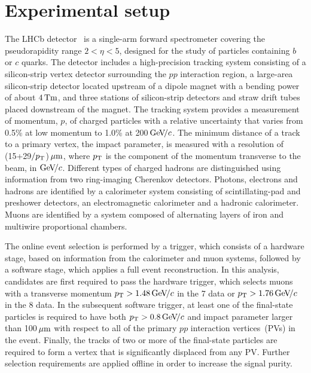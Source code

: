 \documentclass[12pt,a4paper]{article}
\def\ptot       {\mbox{$p$}\xspace}
\def\pt         {\mbox{$p_{\rm T}$}\xspace}
\def\Pb      {\ensuremath{b}\xspace}
\def\Pc      {\ensuremath{c}\xspace}
\def\cquark    {\ensuremath{\Pc}\xspace}
\def\bquark    {\ensuremath{\Pb}\xspace}
\def\lhcb {\mbox{LHCb}\xspace}
\def\mum  {\ensuremath{\rm \mu m}\xspace}
\newcommand{\tev}{\ifthenelse{\boolean{inbibliography}}{\ensuremath{~T\kern -0.05em eV}\xspace}{\ensuremath{\mathrm{\,Te\kern -0.1em V}}}\xspace}
\newcommand{\gevc}{\ensuremath{{\mathrm{\,Ge\kern -0.1em V\!/}c}}\xspace}
\begin{document}
\section{Experimental setup}
\label{sec:exp_setup}

The \lhcb detector~\cite{LHCb-DP-2014-002,Alves:2008zz} is a single-arm forward
spectrometer covering the \mbox{pseudorapidity} range $2<\eta <5$,
designed for the study of particles containing \bquark or \cquark
quarks. The detector includes a high-precision tracking system
consisting of a silicon-strip vertex detector surrounding the $pp$
interaction region, a large-area silicon-strip detector located
upstream of a dipole magnet with a bending power of about
$4{\rm\,Tm}$, and three stations of silicon-strip detectors and straw
drift tubes placed downstream of the magnet.
The tracking system provides a measurement of momentum, \ptot, of charged particles with
a relative uncertainty that varies from 0.5\% at low momentum to 1.0\% at 200\gevc.
The minimum distance of a track to a primary vertex, the impact parameter, is measured with a resolution of (15+29$/\pt$)$\,\mum$,
where \pt is the component of the momentum transverse to the beam, in\,\gevc.
Different types of charged hadrons are distinguished using information
from two ring-imaging Cherenkov detectors. 
Photons, electrons and hadrons are identified by a calorimeter system consisting of
scintillating-pad and preshower detectors, an electromagnetic
calorimeter and a hadronic calorimeter. Muons are identified by a
system composed of alternating layers of iron and multiwire
proportional chambers.

The online event selection is performed by a trigger, 
which consists of a hardware stage, based on information from the calorimeter and muon
systems, followed by a software stage, which applies a full event
reconstruction.
In this analysis, candidates are first required to pass the hardware trigger,
  which selects muons with a transverse momentum $\pt>1.48\gevc$ 
  in the 7\tev data or $\pt>1.76\gevc$ in the 8\tev data.
  In the subsequent software trigger, at least
  one of the final-state particles is required to have both
  $\pt>0.8\gevc$ and impact parameter larger than 100$\,\mum$ with respect to all
  of the primary $pp$ interaction vertices~(PVs) in the
  event. Finally, the tracks of two or more of the final-state
  particles are required to form a vertex that is significantly
  displaced from any PV.
 Further selection requirements are applied offline  in order to increase the signal purity. 
\end{document}
